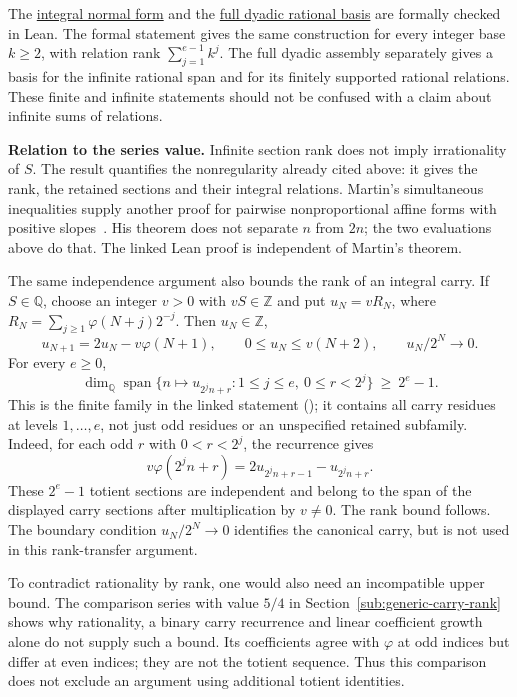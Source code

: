 \documentclass[11pt]{article}
\theoremstyle{plain}
\theoremstyle{definition}
\theoremstyle{remark}
\newcommand{\lean}[2]{\leanlink{#2}}
\newcommand{\Z}{\mathbb{Z}}
\newcommand{\Q}{\mathbb{Q}}
\newcommand{\ph}{\varphi}
\begin{document}
The \href{https://github.com/wcook04/plectis-erdos/blob/25ef6245d15a47548c6926369ae8f1a0f0a14a80/ErdosProblems/Erdos249/PaperCompleteR8/KernelRelationBasis.lean#L398}{integral normal form} and the \href{https://github.com/wcook04/plectis-erdos/blob/25ef6245d15a47548c6926369ae8f1a0f0a14a80/ErdosProblems/Erdos249/PaperCompleteR8/FullKernelAssemblies.lean#L156}{full dyadic rational basis} are formally checked in Lean.
The formal statement gives the same construction for every integer base
$k\ge2$, with relation rank $\sum_{j=1}^{e-1}k^j$.  The full dyadic
assembly separately gives a basis for the infinite rational span and for
its finitely supported rational relations.  These finite and infinite
statements should not be confused with a claim about infinite sums of
relations.

\textbf{Relation to the series value.}
Infinite section rank does not imply irrationality of $S$. The result
quantifies the nonregularity already cited above: it gives the rank,
the retained sections and their integral relations. Martin's simultaneous
inequalities supply another proof for pairwise nonproportional affine
forms with positive slopes~\cite[Theorem~1]{martin-phi-inequalities}.
His theorem does not separate $n$ from $2n$; the two
evaluations above do that. The linked Lean proof is independent of
Martin's theorem.

The same independence argument also bounds the rank of an integral carry.
If $S\in\Q$, choose an integer $v>0$ with $vS\in\Z$ and put $u_N=vR_N$,
where $R_N=\sum_{j\ge1}\ph(N+j)2^{-j}$. Then $u_N\in\Z$,
\[
 u_{N+1}=2u_N-v\ph(N+1),\qquad
 0\le u_N\le v(N+2),\qquad u_N/2^N\longrightarrow0.
\]
For every $e\ge0$,
\[
 \dim_{\Q}\operatorname{span}
 \{n\mapsto u_{2^j n+r}:1\le j\le e,\ 0\le r<2^j\}
 \ \ge\ 2^e-1.
\]
This is the finite family in the linked statement
(\lean{not\_irrational\_totientSeries\_implies\_unbounded\_carryRank\_unconditional}{TotientCarryKernelRigidity.lean:300});
it contains all carry residues at levels $1,\ldots,e$, not just odd
residues or an unspecified retained subfamily. Indeed, for each odd
$r$ with $0<r<2^j$, the recurrence gives
\[
 v\ph(2^j n+r)=2u_{2^j n+r-1}-u_{2^j n+r}.
\]
These $2^e-1$ totient sections are independent and belong to the span
of the displayed carry sections after multiplication by $v\ne0$.
The rank bound follows. The boundary condition $u_N/2^N\to0$ identifies
the canonical carry, but is not used in this rank-transfer argument.

To contradict rationality by rank, one would also need an incompatible
upper bound. The comparison series with value $5/4$ in
Section~\ref{sub:generic-carry-rank} shows why
rationality, a binary carry recurrence and linear coefficient growth
alone do not supply such a bound. Its coefficients agree with $\ph$
at odd indices but differ at even indices; they are not the totient
sequence. Thus this comparison does not exclude an argument using
additional totient identities.
\end{document}
